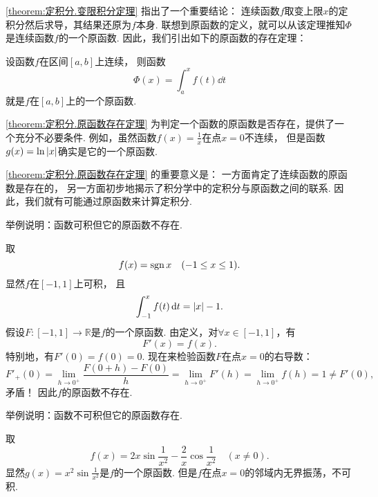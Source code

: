 \cref{theorem:定积分.变限积分定理} 指出了一个重要结论：
连续函数\(f\)取变上限\(x\)的定积分然后求导，其结果还原为\(f\)本身.
联想到原函数的定义，就可以从该定理推知\(\Phi\)是连续函数\(f\)的一个原函数.
因此，我们引出如下的原函数的存在定理：
\begin{theorem}[原函数存在定理]\label{theorem:定积分.原函数存在定理}
设函数\(f\)在区间\([a,b]\)上连续，
则函数\[
	\Phi(x) = \int_a^x f(t) \dd{t}
\]就是\(f\)在\([a,b]\)上的一个原函数.
\end{theorem}
\begin{remark}
\cref{theorem:定积分.原函数存在定理} 为判定一个函数的原函数是否存在，提供了一个充分不必要条件.
例如，虽然函数\(f(x) = \frac1x\)在点\(x=0\)不连续，
但是函数\(g(x) = \ln\abs{x}\)确实是它的一个原函数.
\end{remark}
\begin{remark}
\cref{theorem:定积分.原函数存在定理} 的重要意义是：
一方面肯定了连续函数的原函数是存在的，
另一方面初步地揭示了积分学中的定积分与原函数之间的联系.
因此，我们就有可能通过原函数来计算定积分.
\end{remark}

\begin{example}
举例说明：函数可积但它的原函数不存在.
\begin{solution}
取\[
	f(x) = \operatorname{sgn} x
	\quad(-1 \leq x \leq 1).
\]
显然\(f\)在\([-1,1]\)上可积，
且\[
	\int_{-1}^x f(t) \dd{t}
	= \abs{x} - 1.
\]
假设\(F\colon[-1,1]\to\mathbb{R}\)是\(f\)的一个原函数.
由定义，对\(\forall x\in[-1,1]\)，有\[
	F'(x) = f(x).
\]
特别地，有\(F'(0) = f(0) = 0\).
现在来检验函数\(F\)在点\(x=0\)的右导数：\[
	F'_+(0)
	= \lim_{h\to0^+} \frac{F(0+h)-F(0)}{h}
	= \lim_{h\to0^+} F'(h)
	= \lim_{h\to0^+} f(h)
	= 1
	\neq F'(0),
\]
矛盾！
因此\(f\)的原函数不存在.
\end{solution}
\end{example}

\begin{example}
举例说明：函数不可积但它的原函数存在.
\begin{solution}
取\[
	f(x) = 2 x \sin\frac1{x^2} - \frac2x \cos\frac1{x^2}
	\quad(x\neq0).
\]
显然\(g(x) = x^2 \sin\frac1{x^2}\)是\(f\)的一个原函数.
但是\(f\)在点\(x=0\)的邻域内无界振荡，不可积.
\end{solution}
\end{example}

